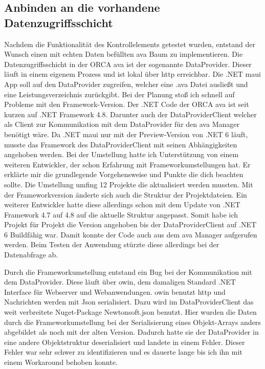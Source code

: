 \subsection{Anbinden an die vorhandene Datenzugriffsschicht}
Nachdem die Funktionalität des Kontrollelements getestet wurden, entstand der Wunsch einen mit echten Daten befüllten \ac{ava} Baum zu implementieren. Die Datenzugriffsschicht in der ORCA \ac{ava} ist der sogenannte DataProvider. Dieser läuft in einem eigenem Prozess und ist lokal über \ac{http} erreichbar. Die .NET \ac{maui} App soll auf den DataProvider zugreifen, welcher eine .ava Datei ausließt und eine Leistungsverzeichnis zurückgibt. Bei der Planung stoß ich schnell auf Probleme mit den Framework-Version. Der .NET Code der ORCA \ac{ava} ist seit kurzen auf .NET Framework 4.8. Darunter auch der DataProviderClient welcher als Client zur Kommunikation mit dem DataProvider für den \ac{ava} Manager benötigt wäre. Da .NET \ac{maui} nur mit der Preview-Version von .NET 6 läuft, musste das Framework des DataProviderClient mit seinen Abhängigkeiten angehoben werden. Bei der Umstellung hatte ich Unterstützung von einem weiteren Entwickler, der schon Erfahrung mit Frameworkumstellungen hat. Er erklärte mir die grundlegende Vorgehensweise und Punkte die dich beachten sollte.
Die Umstellung umfing 12 Projekte die aktualisiert werden mussten. Mit der Frameworkversion änderte sich auch die Struktur der Projektdateien. Ein weiterer Entwickler hatte diese allerdings schon mit dem Update von .NET Framework 4.7 auf 4.8 auf die aktuelle Struktur angepasst. Somit habe ich Projekt für Projekt die Version angehoben bis der DataProviderClient auf .NET 6 Buildfähig war. Damit konnte der Code auch aus dem \ac{ava} Manager aufgerufen werden. Beim Testen der Anwendung stürzte diese allerdings bei der Datenabfrage ab.

Durch die Frameworkumstellung entstand ein Bug bei der Kommunikation mit dem DataProvider. Diese läuft über \ac{owin}, dem damaligen Standard .NET Interface für Webserver und Webanwendungen. \ac{owin} benutzt \ac{http} und Nachrichten werden mit Json serialisiert. Dazu wird im DataProviderClient das weit verbreitete Nuget-Package Newtonsoft.json benutzt. Hier wurden die Daten durch die Frameworkumstellung bei der Serialisierung eines Objekt-Arrays anders abgebildet als noch mit der alten Version. Dadurch hatte sie der DataProvider in eine andere Objektstruktur deserialisiert und landete in einem Fehler. Dieser Fehler war sehr schwer zu identifizieren und es dauerte lange bis ich ihn mit einem Workaround behoben konnte.

